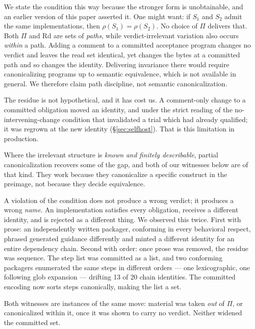 \documentclass[10pt,twocolumn]{article}
\newcommand{\Rd}{\mathrm{Rd}}
\begin{document}
We state the condition this way because the stronger form is
unobtainable, and an earlier version of this paper asserted it. One
might want: if $S_1$ and $S_2$ admit the same implementations, then
$\rho(S_1) = \rho(S_2)$. No choice of $\Pi$ delivers that. Both $\Pi$ and
$\Rd$ are sets of \emph{paths}, while verdict-irrelevant variation also
occurs \emph{within} a path. Adding a comment to a committed acceptance
program changes no verdict and leaves the read set identical, yet changes
the bytes at a committed path and so changes the identity. Delivering
invariance there would require canonicalizing programs up to semantic
equivalence, which is not available in general. We therefore claim path
discipline, not semantic canonicalization.

The residue is not hypothetical, and it has cost us. A comment-only
change to a committed obligation moved an identity, and under the strict
reading of the no-intervening-change condition that invalidated a trial
which had already qualified; it was regrown at the new identity
(\S\ref{sec:selfhost}). That is this limitation in production.

Where the irrelevant structure is \emph{known and finitely describable},
partial canonicalization recovers some of the gap, and both of our
witnesses below are of that kind. They work because they canonicalize a
specific construct in the preimage, not because they decide equivalence.

A violation of the condition does not produce a wrong verdict;
it produces a wrong \emph{name}. An implementation
satisfies every obligation, receives a different identity, and is
rejected as a different thing. We observed this twice. First with prose:
an independently written packager, conforming in every behavioral
respect, phrased generated guidance differently and minted a different
identity for an entire dependency chain. Second with order: once prose
was removed, the residue was sequence. The step list was committed as a
list, and two conforming packagers enumerated the same steps in
different orders --- one lexicographic, one following glob expansion ---
drifting 13 of 20 chain identities. The committed encoding now sorts
steps canonically, making the list a set.

Both witnesses are instances of the same move: material was taken
\emph{out} of $\Pi$, or canonicalized within it, once it was shown to
carry no verdict. Neither widened the committed set.
\end{document}
